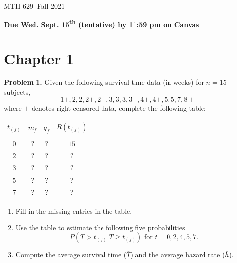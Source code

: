 \documentclass[12pt]{article}
\begin{document}
{
            \hfill {MTH 629, Fall 2021}}
\bigskip

{\bf Due Wed. Sept. 15\textsuperscript{th} (tentative) by 11:59 pm on Canvas}

\section{Chapter 1}

\textbf{Problem 1.}
Given the following survival time data (in weeks) for $n = 15$ subjects,
$$
1+, 2, 2, 2+, 2+, 3, 3, 3, 3+, 4+, 4+, 5, 5, 7, 8+
$$ where $+$ denotes right censored data, complete the following table:

\begin{center}
\begin{tabular}{ c c c c }
 $t_{(f)}$ & $m_{f}$ & $q_{f}$ & $R(t_{(f)})$ \\
 \hline \\
 $0$ & $?$ & $?$ & $15$ \\
 $2$ &?  &?  &? \\
 $3$ &?  &?  &? \\
 $5$ &?  &?  &? \\
 $7$ &?  &?  &?
\end{tabular}
\end{center}

\begin{enumerate}
\item Fill in the missing entries in the table.
\item Use the table to estimate the following five probabilities
\[
P(T>t_{(f)}|T \ge t_{(f)}) \text{ for } t=0,2,4,5,7.
\]
\item Compute the average survival time ($\overline{T}$) and the average hazard rate ($\overline{h}$).
\end{enumerate}
\end{document}
